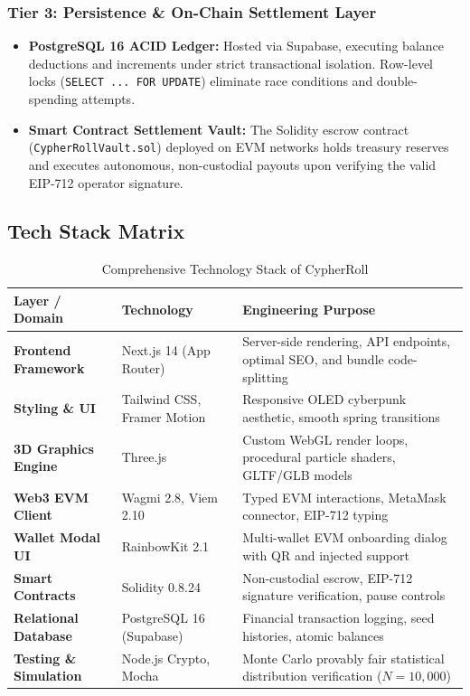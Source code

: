 \subsubsection{Tier 3: Persistence \& On-Chain Settlement Layer}
\begin{itemize}[leftmargin=1.5em]
    \item \textbf{PostgreSQL 16 ACID Ledger:} Hosted via Supabase, executing balance deductions and increments under strict transactional isolation. Row-level locks (\texttt{SELECT ... FOR UPDATE}) eliminate race conditions and double-spending attempts.
    \item \textbf{Smart Contract Settlement Vault:} The Solidity escrow contract (\texttt{CypherRollVault.sol}) deployed on EVM networks holds treasury reserves and executes autonomous, non-custodial payouts upon verifying the valid EIP-712 operator signature.
\end{itemize}

\subsection{Tech Stack Matrix}

\begin{table}[h!]
\centering
\renewcommand{\arraystretch}{1.25}
\begin{tabularx}{\textwidth}{@{} l l X @{}}
\toprule
\textbf{Layer / Domain} & \textbf{Technology} & \textbf{Engineering Purpose} \\
\midrule
\textbf{Frontend Framework} & Next.js 14 (App Router) & Server-side rendering, API endpoints, optimal SEO, and bundle code-splitting \\
\textbf{Styling \& UI} & Tailwind CSS, Framer Motion & Responsive OLED cyberpunk aesthetic, smooth spring transitions \\
\textbf{3D Graphics Engine} & Three.js & Custom WebGL render loops, procedural particle shaders, GLTF/GLB models \\
\textbf{Web3 EVM Client} & Wagmi 2.8, Viem 2.10 & Typed EVM interactions, MetaMask connector, EIP-712 typing \\
\textbf{Wallet Modal UI} & RainbowKit 2.1 & Multi-wallet EVM onboarding dialog with QR and injected support \\
\textbf{Smart Contracts} & Solidity 0.8.24 & Non-custodial escrow, EIP-712 signature verification, pause controls \\
\textbf{Relational Database} & PostgreSQL 16 (Supabase) & Financial transaction logging, seed histories, atomic balances \\
\textbf{Testing \& Simulation} & Node.js Crypto, Mocha & Monte Carlo provably fair statistical distribution verification ($N=10,000$) \\
\bottomrule
\end{tabularx}
\caption{Comprehensive Technology Stack of CypherRoll}
\end{table}
